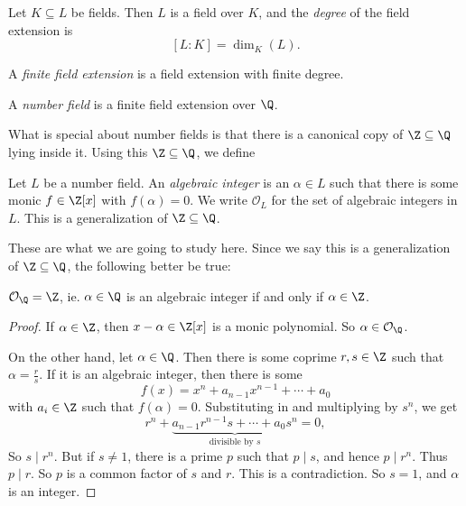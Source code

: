 \documentclass[a4paper]{article}
\begin{document}
\begin{defi}
  Let $K \subseteq L$ be fields. Then $L$ is a field over $K$, and the \emph{degree} of the field extension is
  \[
    [L:K] = \dim_K (L).
  \]
\end{defi}

\begin{defi}
  A \emph{finite field extension} is a field extension with finite degree.
\end{defi}

\begin{defi}
  A \emph{number field} is a finite field extension over $\Q$.
\end{defi}

What is special about number fields is that there is a canonical copy of $\Z \subseteq \Q$ lying inside it. Using this $\Z \subseteq \Q$, we define
\begin{defi}
  Let $L$ be a number field. An \emph{algebraic integer} is an $\alpha \in L$ such that there is some monic $f \in \Z[x]$ with $f(\alpha) = 0$. We write $\mathcal{O}_L$ for the set of algebraic integers in $L$. This is a generalization of $\Z \subseteq \Q$.
\end{defi}

These are what we are going to study here. Since we say this is a generalization of $\Z \subseteq \Q$, the following better be true:

\begin{lemma}
  $\mathcal{O}_\Q = \Z$, ie. $\alpha \in \Q$ is an algebraic integer if and only if $\alpha \in \Z$.
\end{lemma}

\begin{proof}
  If $\alpha \in \Z$, then $x - \alpha \in \Z[x]$ is a monic polynomial. So $\alpha \in \mathcal{O}_\Q$.

  On the other hand, let $\alpha \in \Q$. Then there is some coprime $r, s \in \Z$ such that $\alpha = \frac{r}{s}$. If it is an algebraic integer, then there is some
  \[
    f(x) = x^n + a_{n - 1} x^{n - 1} + \cdots + a_0
  \]
  with $a_i \in \Z$ such that $f(\alpha) = 0$. Substituting in and multiplying by $s^n$, we get
  \[
    r^n + \underbrace{a_{n - 1} r^{n - 1}s + \cdots + a_0 s^n}_{\text{divisible by }s} = 0,
  \]
  So $s\mid r^n$. But if $s\not= 1$, there is a prime $p$ such that $p \mid s$, and hence $p \mid r^n$. Thus $p \mid r$. So $p$ is a common factor of $s$ and $r$. This is a contradiction. So $s = 1$, and $\alpha$ is an integer.
\end{proof}
\end{document}
